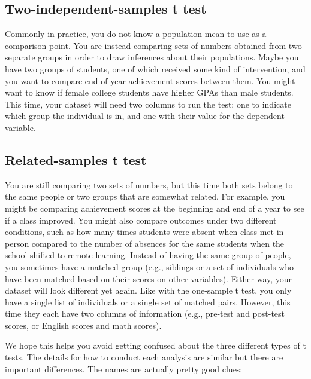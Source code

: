 \documentclass[
  letterpaper,
  DIV=11,
  numbers=noendperiod]{scrreprt}
\begin{document}
\subsection{Two-independent-samples t
test}\label{two-independent-samples-t-test}

Commonly in practice, you do not know a population mean to use as a
comparison point. You are instead comparing sets of numbers obtained
from two separate groups in order to draw inferences about their
populations. Maybe you have two groups of students, one of which
received some kind of intervention, and you want to compare end-of-year
achievement scores between them. You might want to know if female
college students have higher GPAs than male students. This time, your
dataset will need two columns to run the test: one to indicate which
group the individual is in, and one with their value for the dependent
variable.

\subsection{Related-samples t test}\label{related-samples-t-test}

You are still comparing two sets of numbers, but this time both sets
belong to the same people or two groups that are somewhat related. For
example, you might be comparing achievement scores at the beginning and
end of a year to see if a class improved. You might also compare
outcomes under two different conditions, such as how many times students
were absent when class met in-person compared to the number of absences
for the same students when the school shifted to remote learning.
Instead of having the same group of people, you sometimes have a matched
group (e.g., siblings or a set of individuals who have been matched
based on their scores on other variables). Either way, your dataset will
look different yet again. Like with the one-sample t test, you only have
a single list of individuals or a single set of matched pairs. However,
this time they each have two columns of information (e.g., pre-test and
post-test scores, or English scores and math scores).

We hope this helps you avoid getting confused about the three different
types of t tests. The details for how to conduct each analysis are
similar but there are important differences. The names are actually
pretty good clues:
\end{document}
